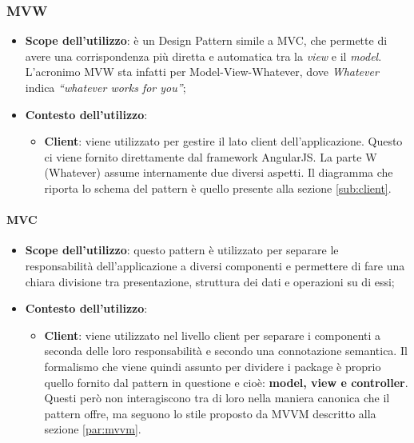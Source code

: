 	\subsubsection{MVW} %
	\label{ssub:mvw}
		\begin{itemize}
			\item \textbf{Scope dell'utilizzo}: è un Design Pattern simile a MVC, che permette di avere una corrispondenza più diretta e automatica tra la \emph{view} e il \emph{model}. L'acronimo MVW sta infatti per Model-View-Whatever, dove \emph{Whatever} indica \emph{``whatever works for you''};
			\item \textbf{Contesto dell'utilizzo}: 
				\begin{itemize}
					\item \textbf{Client}: viene utilizzato per gestire il lato client dell'applicazione. Questo ci viene fornito direttamente dal framework AngularJS. La parte W (Whatever) assume internamente due diversi aspetti. \newline
					Il diagramma che riporta lo schema del pattern è quello presente alla sezione \ref{sub:client}.
				\end{itemize}
		\end{itemize}

		\paragraph{MVC} %
		\label{par:mvc}
			\begin{itemize}
				\item \textbf{Scope dell'utilizzo}: questo pattern è utilizzato per separare le responsabilità dell’applicazione a diversi componenti e permettere di fare una chiara divisione tra presentazione, struttura dei dati e operazioni su di essi;

				\item \textbf{Contesto dell'utilizzo}: 
					\begin{itemize}
						\item \textbf{Client}: viene utilizzato nel livello client per separare i componenti a seconda delle loro responsabilità e secondo una connotazione semantica. Il formalismo che viene quindi assunto per dividere i package è proprio quello fornito dal pattern in questione e cioè: \textbf{model, view e controller}. Questi però non interagiscono tra di loro nella maniera canonica che il pattern offre, ma seguono lo stile proposto da MVVM descritto alla sezione \ref{par:mvvm}.
					\end{itemize}
			\end{itemize}

